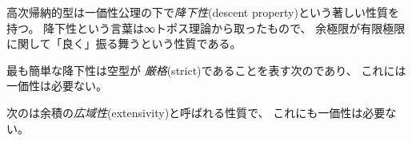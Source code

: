 \documentclass[index]{subfiles}
\begin{document}

高次帰納的型は一価性公理の下で\emph{降下性}(descent property)という著しい性質を持つ。
降下性という言葉は∞トポス理論から取ったもので、
余極限が有限極限に関して「良く」振る舞うという性質である。

最も簡単な降下性は空型\myInlineMath{\myEmptyType}が
\emph{厳格}(strict)であることを表す次のであり、
これには一価性は必要ない。



次のは余積の\emph{広域性}(extensivity)と呼ばれる性質で、
これにも一価性は必要ない。


\end{document}
